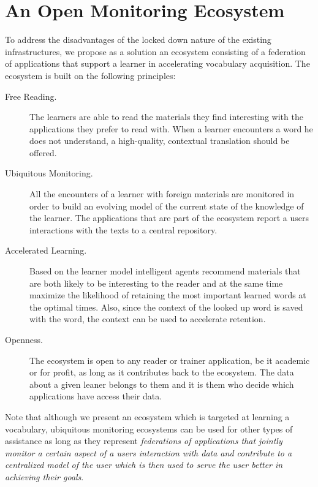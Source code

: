 

\section {An Open Monitoring Ecosystem}

To address the disadvantages of the locked down nature of the existing infrastructures, we propose as a solution an ecosystem consisting of a federation of applications that support a learner in accelerating vocabulary acquisition. The ecosystem is built on the following principles:

\begin{description}

	\item [Free Reading.] The learners are able to read the materials they find interesting with the applications they prefer to read with. When a learner encounters a word he does not understand, a high-quality, contextual translation should be offered.

	\item [Ubiquitous Monitoring.] All the encounters of a learner with foreign materials are monitored in order to build an evolving model of the current state of the knowledge of the learner. The applications that are part of the ecosystem report a users interactions with the texts to a central repository.


	\item [Accelerated Learning.] Based on the learner model intelligent agents recommend materials that are both likely to be interesting to the reader and at the same time maximize the likelihood of retaining the most important learned words at the optimal times. Also, since the context of the looked up word is saved with the word, the context can be used to accelerate retention.

	\item [Openness.] The ecosystem is open to any reader or trainer application, be it academic or for profit, as long as it contributes back to the ecosystem. The data about a given leaner belongs to them and it is them who decide which applications have access their data.

\end{description}

Note that although we present an ecosystem which is targeted at learning a vocabulary, ubiquitous monitoring ecosystems can be used for other types of assistance as long as they represent {\em federations of applications that jointly monitor a certain aspect of a users interaction with data and contribute to a centralized model of the user which is then used to serve the user better in achieving their goals}.



